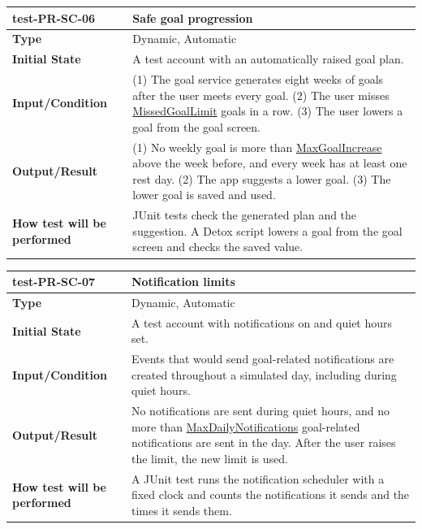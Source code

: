 \documentclass[12pt, titlepage]{article}
\newcommand{\const}[1]{\hyperlink{const:#1}{\textsf{#1}}}
\begin{document}
\vspace{1em}

\noindent\begin{tabularx}{\textwidth}{>{\raggedright\arraybackslash}p{3.5cm}X}
  \toprule
  \textbf{test-PR-SC-06} & \textbf{Safe goal progression}\\
  \midrule
  \textbf{Type} & Dynamic, Automatic\\
  \textbf{Initial State} & A test account with an automatically raised goal plan.\\
  \textbf{Input/Condition} & (1) The goal service generates eight weeks of goals after the user meets every goal. (2) The user misses \const{MissedGoalLimit} goals in a row. (3) The user lowers a goal from the goal screen.\\
  \textbf{Output/Result} & (1) No weekly goal is more than \const{MaxGoalIncrease} above the week before, and every week has at least one rest day. (2) The app suggests a lower goal. (3) The lower goal is saved and used.\\
  \textbf{How test will be performed} & JUnit tests check the generated plan and the suggestion. A Detox script lowers a goal from the goal screen and checks the saved value.\\
  \bottomrule
\end{tabularx}

\vspace{1em}

\noindent\begin{tabularx}{\textwidth}{>{\raggedright\arraybackslash}p{3.5cm}X}
  \toprule
  \textbf{test-PR-SC-07} & \textbf{Notification limits}\\
  \midrule
  \textbf{Type} & Dynamic, Automatic\\
  \textbf{Initial State} & A test account with notifications on and quiet hours set.\\
  \textbf{Input/Condition} & Events that would send goal-related notifications are created throughout a simulated day, including during quiet hours.\\
  \textbf{Output/Result} & No notifications are sent during quiet hours, and no more than \const{MaxDailyNotifications} goal-related notifications are sent in the day. After the user raises the limit, the new limit is used.\\
  \textbf{How test will be performed} & A JUnit test runs the notification scheduler with a fixed clock and counts the notifications it sends and the times it sends them.\\
  \bottomrule
\end{tabularx}
\end{document}
